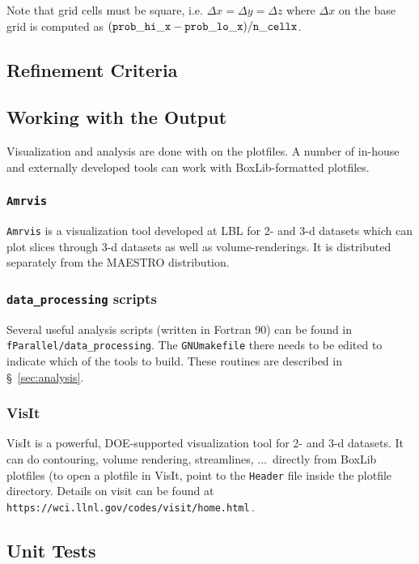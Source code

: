 Note that grid cells must be square, i.e. $\Delta x = \Delta y = \Delta z$
where $\Delta x$ on the base grid is computed as $({\tt prob\_hi\_x}
- {\tt prob\_lo\_x})/{\tt n\_cellx}$. 

\subsection{Refinement Criteria}

\subsection{Working with the Output}

Visualization and analysis are done with on the plotfiles.  A
number of in-house and externally developed tools can work 
with BoxLib-formatted plotfiles.


\subsubsection{\tt Amrvis}

{\tt Amrvis} is a visualization tool developed at LBL for 2- and 3-d
datasets which can plot slices through 3-d datasets as well as
volume-renderings.  It is distributed separately from the MAESTRO
distribution.


\subsubsection{{\tt data\_processing} scripts}

Several useful analysis scripts (written in Fortran 90) can be found
in {\tt fParallel/data\_processing}.  The {\tt GNUmakefile} there
needs to be edited to indicate which of the tools to build.  These
routines are described in \S~\ref{sec:analysis}.


\subsubsection{VisIt}

VisIt is a powerful, DOE-supported visualization tool for 2- and 3-d
datasets.  It can do contouring, volume rendering, streamlines, ...\
directly from BoxLib plotfiles (to open a plotfile in VisIt, point to
the {\tt Header} file inside the plotfile directory.  Details on
visit can be found at {\tt https://wci.llnl.gov/codes/visit/home.html}\,.



\subsection{Unit Tests}

